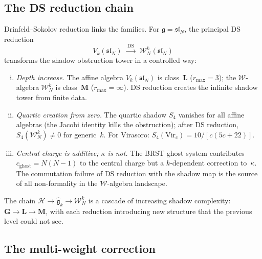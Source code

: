 \documentclass[11pt,reqno]{amsart}
\theoremstyle{definition}
\theoremstyle{remark}
\providecommand{\cH}{\mathcal{H}}
\providecommand{\cW}{\mathcal{W}}
\providecommand{\fg}{\mathfrak{g}}
\providecommand{\Vir}{\mathrm{Vir}}
\numberwithin{equation}{section}
\begin{document}
\subsection{The DS reduction chain}
\label{ssec:ds-chain}

Drinfeld--Sokolov reduction links the families. For
$\fg = \mathfrak{sl}_N$, the principal DS reduction
\begin{equation}\label{eq:ds-chain}
V_k(\mathfrak{sl}_N)
\;\xrightarrow{\;\mathrm{DS}\;}
\;\cW^k_N(\mathfrak{sl}_N)
\end{equation}
transforms the shadow obstruction tower in a controlled
way:
\begin{enumerate}[(i)]
\item \emph{Depth increase.}
 The affine algebra $V_k(\mathfrak{sl}_N)$ is
 class~$\mathbf{L}$ ($r_{\max} = 3$); the
 $\cW$-algebra $\cW^k_N$ is class~$\mathbf{M}$
 ($r_{\max} = \infty$). DS reduction creates the
 infinite shadow tower from finite data.

\item \emph{Quartic creation from zero.}
 The quartic shadow $S_4$ vanishes for all affine
 algebras (the Jacobi identity kills the
 obstruction); after DS reduction,
 $S_4(\cW^k_N) \ne 0$ for generic~$k$.
 For Virasoro:
 $S_4(\Vir_c) = 10/[c(5c+22)]$.

\item \emph{Central charge is additive; $\kappa$ is not.}
 The BRST ghost system contributes
 $c_{\mathrm{ghost}} = N(N{-}1)$ to the central
 charge but a $k$-dependent correction to~$\kappa$.
 The commutation failure of DS reduction with the
 shadow map is the source of all non-formality in
 the $\cW$-algebra landscape.
\end{enumerate}

The chain $\cH \to \widehat{\fg}_k \to \cW^k_N$ is a
cascade of increasing shadow complexity:
$\mathbf{G} \to \mathbf{L} \to \mathbf{M}$, with each
reduction introducing new structure that the previous
level could not see.


\subsection{The multi-weight correction}
\label{ssec:multi-weight-landscape}
\end{document}
